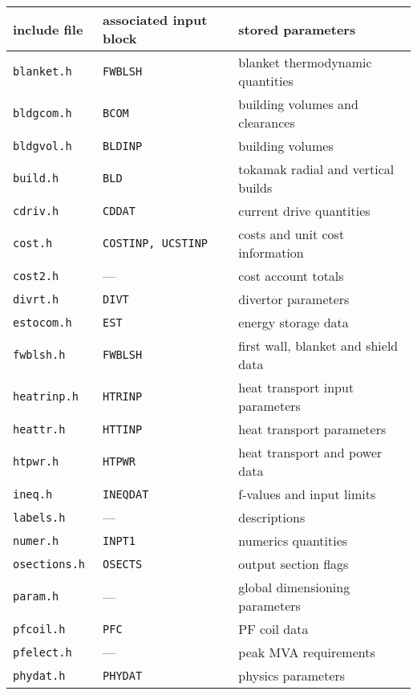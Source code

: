 \documentclass[11pt,a4paper]{report}
\begin{document}
\begin{table}
\begin{center}

\begin{tabular}{||l|l||l||} \hline
include file    & associated input block & stored parameters \\ \hline
\tt blanket.h   & \tt FWBLSH           & blanket thermodynamic quantities \\
\tt bldgcom.h   & \tt BCOM             & building volumes and clearances \\
\tt bldgvol.h   & \tt BLDINP           & building volumes \\
\tt build.h     & \tt BLD              & tokamak radial and vertical builds \\
\tt cdriv.h     & \tt CDDAT            & current drive quantities \\
\tt cost.h      & \tt COSTINP, UCSTINP & costs and unit cost information \\
\tt cost2.h     &     ---              & cost account totals \\
\tt divrt.h     & \tt DIVT             & divertor parameters \\
\tt estocom.h   & \tt EST              & energy storage data \\
\tt fwblsh.h    & \tt FWBLSH           & first wall, blanket and shield data \\
\tt heatrinp.h  & \tt HTRINP           & heat transport input parameters \\
\tt heattr.h    & \tt HTTINP           & heat transport parameters \\
\tt htpwr.h     & \tt HTPWR            & heat transport and power data \\
\tt ineq.h      & \tt INEQDAT          & f-values and input limits \\
\tt labels.h    &     ---              & descriptions \\
\tt numer.h     & \tt INPT1            & numerics quantities \\
\tt osections.h & \tt OSECTS           & output section flags \\
\tt param.h     &     ---              & global dimensioning parameters \\
\tt pfcoil.h    & \tt PFC              & PF coil data \\
\tt pfelect.h   &     ---              & peak MVA requirements \\
\tt phydat.h    & \tt PHYDAT           & physics parameters \\

\end{tabular}
\end{center}
\end{table}
\end{document}

